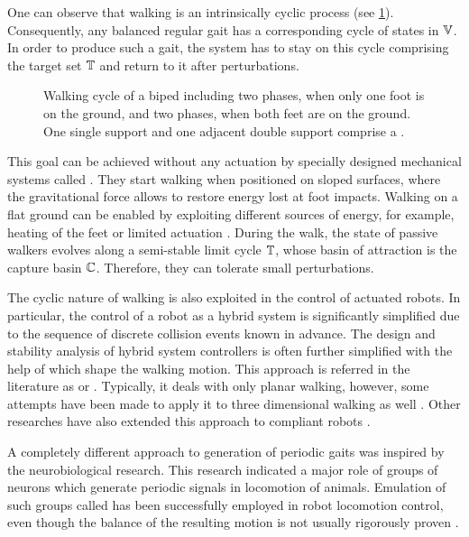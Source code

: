 One can observe that walking is an intrinsically cyclic process (see
\cref{fig.walkcycle}). Consequently, any balanced regular gait has a
corresponding cycle of states in $\mathbb{V}$. In order to produce such a gait,
the system has to stay on this cycle comprising the target set $\mathbb{T}$ and
return to it after perturbations.

%
\begin{figure}[ht]
    \caption[Walking cycle of a biped.]{
    Walking cycle of a biped including two  phases, when
    only one foot is on the ground, and two  phases, when
    both feet are on the ground. One single support and one adjacent double
    support comprise a .
    }
    \label{fig.walkcycle}
\end{figure}
%

This goal can be achieved without any actuation by specially designed
mechanical systems called  \cite{McGeer1990ijrs}. They
start walking when positioned on sloped surfaces, where the gravitational force
allows to restore energy lost at foot impacts. Walking on a flat ground can be
enabled by exploiting different sources of energy, for example, heating of the
feet \cite{Nemoto2015iros} or limited actuation \cite{Collins2005science}.
During the walk, the state of passive walkers evolves along a semi-stable limit
cycle $\mathbb{T}$, whose basin of attraction is the capture basin $\mathbb{C}$.
Therefore, they can tolerate small perturbations.


The cyclic nature of walking is also exploited in the control of actuated
robots. In particular, the control of a robot as a hybrid system is
significantly simplified due to the sequence of discrete collision events known
in advance. The design and stability analysis of hybrid system controllers is
often further simplified with the help of  which shape
the walking motion. This approach is referred in the literature as  or  \cite{Westervelt2003tranac,
Chevallereau2003csm, Grizzle2006isccsp, Westervelt2007locomotion}. Typically,
it deals with only planar walking, however, some attempts have been made to
apply it to three dimensional walking as well \cite{Chevallereau2009tro}. Other
researches have also extended this approach to compliant robots
\cite{Sreenath2010ijrr}.


A completely different approach to generation of periodic gaits was inspired by
the neurobiological research. This research indicated a major role of groups of
neurons which generate periodic signals in locomotion of animals. Emulation of
such groups called  has been successfully
employed in robot locomotion control, even though the balance of the resulting
motion is not usually rigorously proven  \cite{Fukuoka2003ijrr,
Nakanishi2004ras, Ijspeert2008nn}.


